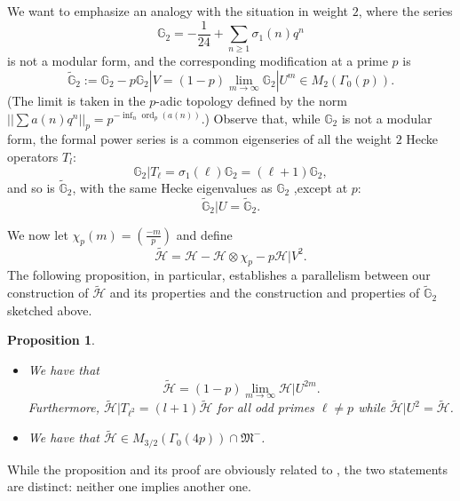 \documentclass[11pt,letterpaper]{amsart}
\newcommand{\cH}{{\mathcal H}}
\DeclareMathOperator{\ord}{ord}
\newcommand{\gM}{{\mathfrak M}}
\newtheorem{prop}{Proposition}
\theoremstyle{remark}
\begin{document}
We want to emphasize an analogy with the situation in weight $2$, where the series
\[
\mathbb{G}_2 = -\frac{1}{24} + \sum_{n \geq 1} \sigma_1(n) q^n
\]
is not a modular form, and the corresponding modification at a prime $p$ is 
\[
\tilde{\mathbb{G}}_2:= \mathbb{G}_2 - p \mathbb{G}_2|V = (1-p)\lim_{m \rightarrow \infty} \mathbb{G}_2 |U^m \in M_2(\Gamma_0(p)).
\]
(The limit is taken in the $p$-adic topology defined by the norm $||\sum a(n) q^n||_p = p^{-\inf_n \ord_p(a(n))}$.)
Observe that, while $\mathbb{G}_2$ is not a modular form, the formal power series is a common eigenseries  of all the weight $2$ Hecke operators $T_l$:
\[
\mathbb{G}_2|T_\ell=\sigma_1(\ell) \mathbb{G}_2 = (\ell+1)\mathbb{G}_2,
\]
and so is $\tilde{\mathbb{G}}_2$, with the same Hecke eigenvalues as $\mathbb{G}_2$ ,except  at $p$:
\[
\tilde{\mathbb{G}}_2|U = \tilde{\mathbb{G}}_2.
\]

We now let $\chi_p(m) = \left( \frac{-m}{p} \right)$ and define
\[
\tilde{\cH} = \cH - \cH \otimes \chi_p - p \cH|V^2.
\]
The following proposition, in particular, establishes a parallelism between our construction of $\tilde{\cH}$ and its properties and the construction and properties of $\tilde{\mathbb{G}}_2$ sketched above.
\begin{prop} \mbox{} \label{prop_tilde_H}

\begin{itemize}

 \item[\normalfont(i)]

We have that
\[
\tilde{\cH} = (1-p)\lim_{m \rightarrow \infty} \cH|U^{2m}.
\]
Furthermore, $\tilde{\cH}|T_{\ell^2} = (l+1) \tilde{\cH}$ for all odd primes $\ell \neq p$ while  $\tilde{\cH}|U^2 = \tilde{\cH}$.


\item[\normalfont(ii)]

We have that $\tilde{\cH} \in M_{3/2}(\Gamma_0(4p)) \cap \gM^-$.

\end{itemize}
\end{prop}

While the proposition and its proof are obviously related to \cite[Lemma 2.6]{BK}, the two statements are distinct: neither one implies another one.
\end{document}
